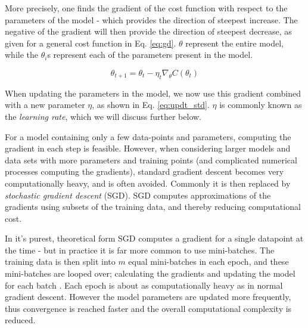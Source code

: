More precisely, one finds the gradient of the cost function with respect to the parameters of the model - which provides the direction of steepest increase. The negative of the gradient will then provide the direction of steepest decrease, as given for a general cost function in Eq. \ref{eq:gd}. $\theta$ represent the entire model, while the $\theta_i$s represent each of the parameters present in the model.

\begin{equation}\label{eq:updt_std}
    \theta_{t+1} = \theta_t - \eta_t \nabla_{\theta} C(\theta_t)
\end{equation}

When updating the parameters in the model, we now use this gradient combined with a new parameter $\eta$, as shown in Eq. \ref{eq:updt_std}.
$\eta$ is commonly known as the \textit{learning rate}, which we will discuss further below.

For a model containing only a few data-points and parameters, computing the gradient in each step is feasible.
However, when considering larger models and data sets with more parameters and training points (and complicated numerical processes computing the gradients), standard gradient descent becomes very computationally heavy, and is often avoided.
Commonly it is then replaced by \textit{stochastic gradient descent} (SGD).
SGD computes approximations of the gradients using subsets of the training data, and thereby reducing computational cost.


In it's purest, theoretical form SGD computes a gradient for a single datapoint at the time - but in practice it is far more common to use mini-batches. The training data is then split into $m$ equal mini-batches in each epoch, and these mini-batches are looped over; calculating the gradients and updating the model for each batch \textcite[p. 47]{raschka}.
Each epoch is about as computationally heavy as in normal gradient descent. However the model parameters are updated more frequently, thus convergence is reached faster and the overall computational complexity is reduced.

